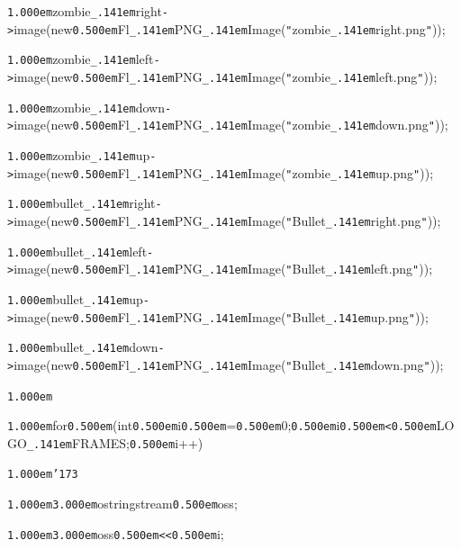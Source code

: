 \documentclass[12pt]{article}
\begin{document}
\noindent
{}{\tt\mc \kern1.000em}zombie{\tt\_\kern.141em}right{\tt -}{\tt >}image(new{\tt\mc \kern0.500em}Fl{\tt\_\kern.141em}PNG{\tt\_\kern.141em}Image({\tt "}zombie{\tt\_\kern.141em}right.png{\tt "}));

\noindent
{}{\tt\mc \kern1.000em}zombie{\tt\_\kern.141em}left{\tt -}{\tt >}image(new{\tt\mc \kern0.500em}Fl{\tt\_\kern.141em}PNG{\tt\_\kern.141em}Image({\tt "}zombie{\tt\_\kern.141em}left.png{\tt "}));

\noindent
{}{\tt\mc \kern1.000em}zombie{\tt\_\kern.141em}down{\tt -}{\tt >}image(new{\tt\mc \kern0.500em}Fl{\tt\_\kern.141em}PNG{\tt\_\kern.141em}Image({\tt "}zombie{\tt\_\kern.141em}down.png{\tt "}));

\noindent
{}{\tt\mc \kern1.000em}zombie{\tt\_\kern.141em}up{\tt -}{\tt >}image(new{\tt\mc \kern0.500em}Fl{\tt\_\kern.141em}PNG{\tt\_\kern.141em}Image({\tt "}zombie{\tt\_\kern.141em}up.png{\tt "}));

\noindent
{}{\tt\mc \kern1.000em}bullet{\tt\_\kern.141em}right{\tt -}{\tt >}image(new{\tt\mc \kern0.500em}Fl{\tt\_\kern.141em}PNG{\tt\_\kern.141em}Image({\tt "}Bullet{\tt\_\kern.141em}right.png{\tt "}));

\noindent
{}{\tt\mc \kern1.000em}bullet{\tt\_\kern.141em}left{\tt -}{\tt >}image(new{\tt\mc \kern0.500em}Fl{\tt\_\kern.141em}PNG{\tt\_\kern.141em}Image({\tt "}Bullet{\tt\_\kern.141em}left.png{\tt "}));

\noindent
{}{\tt\mc \kern1.000em}bullet{\tt\_\kern.141em}up{\tt -}{\tt >}image(new{\tt\mc \kern0.500em}Fl{\tt\_\kern.141em}PNG{\tt\_\kern.141em}Image({\tt "}Bullet{\tt\_\kern.141em}up.png{\tt "}));

\noindent
{}{\tt\mc \kern1.000em}bullet{\tt\_\kern.141em}down{\tt -}{\tt >}image(new{\tt\mc \kern0.500em}Fl{\tt\_\kern.141em}PNG{\tt\_\kern.141em}Image({\tt "}Bullet{\tt\_\kern.141em}down.png{\tt "}));

\noindent
{}{\tt\mc \kern1.000em}

\noindent
{}{\tt\mc \kern1.000em}for{\tt\mc \kern0.500em}(int{\tt\mc \kern0.500em}i{\tt\mc \kern0.500em}={\tt\mc \kern0.500em}0;{\tt\mc \kern0.500em}i{\tt\mc \kern0.500em}{\tt <}{\tt\mc \kern0.500em}LOGO{\tt\_\kern.141em}FRAMES;{\tt\mc \kern0.500em}i++)

\noindent
{}{\tt\mc \kern1.000em}{\tt\char'173}

\noindent
{}{\tt\mc \kern1.000em}{\tt\mc \kern3.000em}ostringstream{\tt\mc \kern0.500em}oss;

\noindent
{}{\tt\mc \kern1.000em}{\tt\mc \kern3.000em}oss{\tt\mc \kern0.500em}{\tt <}{\tt <}{\tt\mc \kern0.500em}i;
\end{document}
